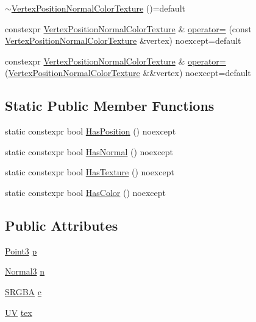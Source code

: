 \begin{DoxyCompactItemize}
\hyperlink{structmage_1_1_vertex_position_normal_color_texture_af3538a12eab74715dd9b5256f8765162}{$\sim$\+Vertex\+Position\+Normal\+Color\+Texture} ()=default
\item 
constexpr \hyperlink{structmage_1_1_vertex_position_normal_color_texture}{Vertex\+Position\+Normal\+Color\+Texture} \& \hyperlink{structmage_1_1_vertex_position_normal_color_texture_a97ad96dc018b200c1fd0c86586ddd5fc}{operator=} (const \hyperlink{structmage_1_1_vertex_position_normal_color_texture}{Vertex\+Position\+Normal\+Color\+Texture} \&vertex) noexcept=default
\item 
constexpr \hyperlink{structmage_1_1_vertex_position_normal_color_texture}{Vertex\+Position\+Normal\+Color\+Texture} \& \hyperlink{structmage_1_1_vertex_position_normal_color_texture_a495b54b0ea751f40d53abc2ffc336557}{operator=} (\hyperlink{structmage_1_1_vertex_position_normal_color_texture}{Vertex\+Position\+Normal\+Color\+Texture} \&\&vertex) noexcept=default
\end{DoxyCompactItemize}
\subsection*{Static Public Member Functions}
\begin{DoxyCompactItemize}
\item 
static constexpr bool \hyperlink{structmage_1_1_vertex_position_normal_color_texture_a493fdcc26dfbee8025da34f2d2600b1f}{Has\+Position} () noexcept
\item 
static constexpr bool \hyperlink{structmage_1_1_vertex_position_normal_color_texture_af1b565b25fd4beb2cff66931cc32de86}{Has\+Normal} () noexcept
\item 
static constexpr bool \hyperlink{structmage_1_1_vertex_position_normal_color_texture_a27f5a115642f443419683417360fd58e}{Has\+Texture} () noexcept
\item 
static constexpr bool \hyperlink{structmage_1_1_vertex_position_normal_color_texture_aee56f3577ac93b0f57084ab76ec45abd}{Has\+Color} () noexcept
\end{DoxyCompactItemize}
\subsection*{Public Attributes}
\begin{DoxyCompactItemize}
\item 
\hyperlink{structmage_1_1_point3}{Point3} \hyperlink{structmage_1_1_vertex_position_normal_color_texture_ac7808865ca6672b7d0f4f8457077bd16}{p}
\item 
\hyperlink{structmage_1_1_normal3}{Normal3} \hyperlink{structmage_1_1_vertex_position_normal_color_texture_a7304bf677ad4f16aea974e63f4324eba}{n}
\item 
\hyperlink{structmage_1_1_s_r_g_b_a}{S\+R\+G\+BA} \hyperlink{structmage_1_1_vertex_position_normal_color_texture_a65ebae1d87000c53290ac7fd44f0bfce}{c}
\item 
\hyperlink{structmage_1_1_u_v}{UV} \hyperlink{structmage_1_1_vertex_position_normal_color_texture_a3477ce06d0778a1119cbf2e961d7c3ed}{tex}
\end{DoxyCompactItemize}
